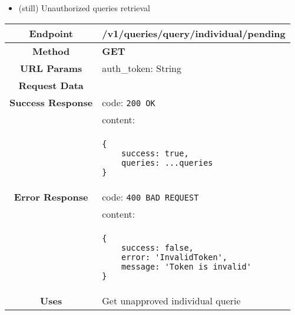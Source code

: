     
        \begin{itemize}
        \item (still) Unauthorized queries retrieval
    \end{itemize}
    \begin{adjustwidth}{1cm}{}
        \begin{longtable}{|c|l|}
            \hline
            \textbf{Endpoint} & /v1/queries/query/individual/pending \\
            \hline
            \textbf{Method} & \textbf{GET} \\
            \hline
            \textbf{URL Params} &  auth\_token: String \\
            \hline
            \textbf{Request Data} & \\
            \hline
            \textbf{Success Response} & code: \texttt{200 OK} \\
            &                           content: \\
            & \begin{minipage}[t]{0.5\textwidth}
                \begin{adjustwidth}{1.5cm}{}
                \begin{verbatim}
{
    success: true, 
    queries: ...queries
}
                \end{verbatim}
                \end{adjustwidth}
              \end{minipage} \\
              \hline
            \textbf{Error Response} & code: \texttt{400 BAD REQUEST} \\
              &                     content: \\
              & \begin{minipage}[t]{0.7\textwidth}
                \begin{adjustwidth}{1.5cm}{}
                \begin{verbatim}
{
    success: false, 
    error: 'InvalidToken',
    message: 'Token is invalid'
}
                \end{verbatim}
                \end{adjustwidth}
                 \vspace{4pt}
              \end{minipage} \\
              \hline
            \textbf{Uses} & Get unapproved individual querie \\
            \hline

\end{longtable}
\end{adjustwidth}
